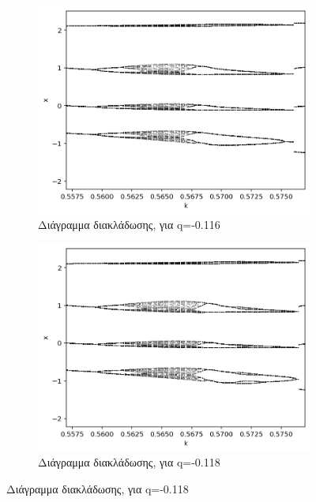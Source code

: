 \begin{figure}[h!]
\begin{subfigure}[b]{0.4\textwidth}
		\centering
		\includegraphics[width=\textwidth]{LateX images/graphs/g4}
		\caption{Διάγραμμα διακλάδωσης, για q=-0.116}
		\label{f:g5}
	\end{subfigure}
	\hfill
	\begin{subfigure}[b]{0.4\textwidth}
		\centering
		\includegraphics[width=\textwidth]{LateX images/graphs/g5}
		\caption{Διάγραμμα διακλάδωσης, για q=-0.118}
		\label{f:g6}
	\end{subfigure}
\end{figure}

